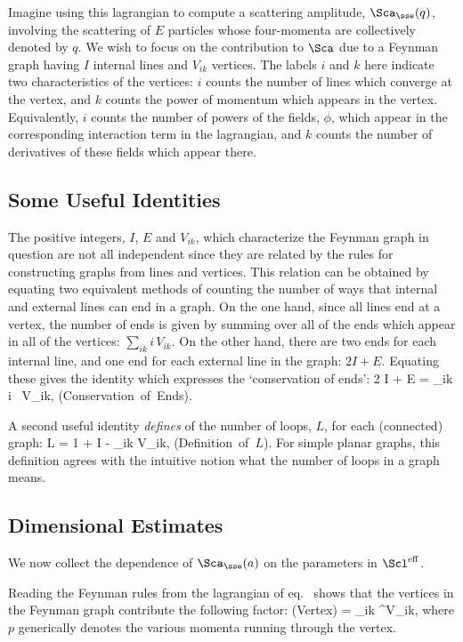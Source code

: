 \documentclass[12pt,epsf]{report}
\def\leff{\Scl^{\rm eff}}
\begin{document}
Imagine using this lagrangian to compute a scattering
amplitude, 
$\Sca_\sse(q)$, involving the scattering of $E$ particles
whose four-momenta are collectively denoted by $q$. We wish
to focus on the contribution to $\Sca$ due to a Feynman
graph having $I$ internal lines and $V_{ik}$ vertices. The
labels $i$ and $k$ here indicate two characteristics of the
vertices: $i$ counts the number of lines which converge at
the vertex, and $k$ counts the power of momentum which
appears in the vertex. Equivalently, $i$ counts the number
of powers of the fields, $\phi$, which appear in the
corresponding interaction term in the lagrangian, and $k$
counts the number of derivatives of these fields which
appear there.

\subsection{Some Useful Identities}

The positive integers, $I$, $E$ and $V_{ik}$, which
characterize the Feynman graph in question are not all
independent since they are related by the rules for
constructing graphs from lines and vertices. This relation
can be obtained by equating two equivalent methods of
counting the number of ways that internal and external
lines can end in a graph. On the one hand, since all lines
end at a vertex, the number of ends is given by summing
over all of the ends which appear in all of the vertices:
$\sum_{ik} i 
\, V_{ik}$. On the other hand, there are two ends for each
internal line, and one end for each external line in the
graph: $2 I + E$. Equating these gives the identity which
expresses the `conservation of ends':
%
\eq
\label{consofends}
2 I + E = \sum_{ik} i \,  V_{ik}, \qquad
\hbox{(Conservation of Ends)}.
\eeq

A second useful identity {\em defines} of the number of
loops, $L$, for each (connected) graph:
%
\eq
\label{loopdef}
L = 1 + I - \sum_{ik} V_{ik}, 
\qquad \hbox{(Definition of $L$)}.
\eeq
%
For simple planar graphs, this definition agrees with the
intuitive notion what the number of loops in a graph means.

\subsection{Dimensional Estimates}

We now collect the dependence of $\Sca_\sse(a)$ on the 
parameters in $\leff$.

Reading the Feynman rules from the lagrangian of
eq.~ shows that the vertices in the Feynman
graph contribute the following factor:
%
\eq
\label{vertexcont}
\hbox{(Vertex)} =  \prod_{ik} ^{V_{ik}},
\eeq
%
where $p$ generically denotes the various momenta running
through the vertex.
\end{document}
